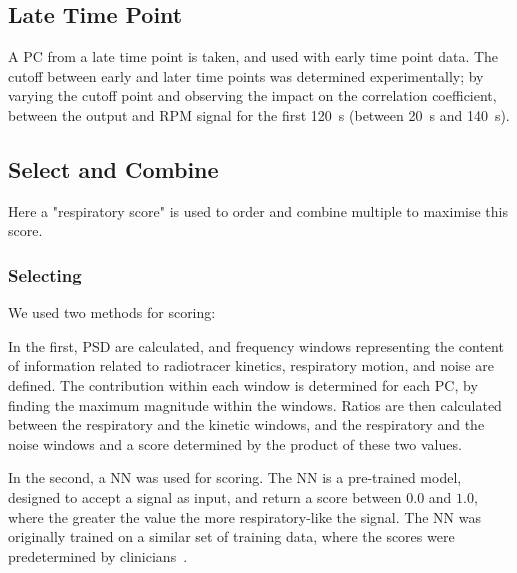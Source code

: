             
    \subsection{Late Time Point} \label{sec:late_time_point}
        A \gls{PC} from a late time point is taken, and used with early time point data. The cutoff between early and later time points was determined experimentally; by varying the cutoff point and observing the impact on the correlation coefficient, between the output and \gls{RPM} signal for the first \SI{120}{\second} (between \SI{20}{\second} and \SI{140}{\second}).
        
    
    \subsection{Select and Combine} \label{sec:select_and_combine}
        Here a "respiratory score" is used to order and combine multiple  to maximise this score.
        
        \subsubsection{Selecting } \label{sec:selecting_pcs}
              We used two methods for scoring:
              
              In the first, \gls{PSD} are calculated, and frequency windows representing the content of information related to radiotracer kinetics, respiratory motion, and noise are defined. The contribution within each window is determined for each \gls{PC}, by finding the maximum magnitude within the windows. Ratios are then calculated between the respiratory and the kinetic windows, and the respiratory and the noise windows and a score determined by the product of these two values.
        
        
            In the second, a \gls{NN} was used for scoring. The \gls{NN} is a pre-trained model, designed to accept a signal as input, and return a score between $0.0$ and $1.0$, where the greater the value the more respiratory-like the signal. The \gls{NN} was originally trained on a similar set of training data, where the scores were predetermined by clinicians~\cite{Walker2020AutomaticAI}.
        
